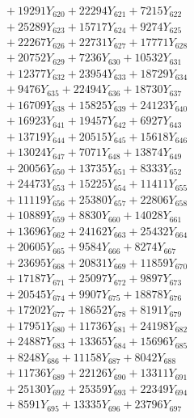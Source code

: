 \documentclass[a4paper,10pt]{article}
\begin{document}
{\begin{align}
&\;  + 19291 Y_{620} + 22294 Y_{621} + 7215 Y_{622} \\[0.3ex]
&\;  + 25289 Y_{623} + 15717 Y_{624} + 9274 Y_{625} \\[0.3ex]
&\;  + 22267 Y_{626} + 22731 Y_{627} + 17771 Y_{628} \\[0.5ex]\allowbreak
&\;  + 20752 Y_{629} + 7236 Y_{630} + 10532 Y_{631} \\[0.3ex]
&\;  + 12377 Y_{632} + 23954 Y_{633} + 18729 Y_{634} \\[0.3ex]
&\;  + 9476 Y_{635} + 22494 Y_{636} + 18730 Y_{637} \\[0.3ex]
&\;  + 16709 Y_{638} + 15825 Y_{639} + 24123 Y_{640} \\[0.3ex]
&\;  + 16923 Y_{641} + 19457 Y_{642} + 6927 Y_{643} \\[0.3ex]
&\;  + 13719 Y_{644} + 20515 Y_{645} + 15618 Y_{646} \\[0.3ex]
&\;  + 13024 Y_{647} + 7071 Y_{648} + 13874 Y_{649} \\[0.3ex]
&\;  + 20056 Y_{650} + 13735 Y_{651} + 8333 Y_{652} \\[0.3ex]
&\;  + 24473 Y_{653} + 15225 Y_{654} + 11411 Y_{655} \\[0.3ex]
&\;  + 11119 Y_{656} + 25380 Y_{657} + 22806 Y_{658} \\[0.5ex]\allowbreak
&\;  + 10889 Y_{659} + 8830 Y_{660} + 14028 Y_{661} \\[0.3ex]
&\;  + 13696 Y_{662} + 24162 Y_{663} + 25432 Y_{664} \\[0.3ex]
&\;  + 20605 Y_{665} + 9584 Y_{666} + 8274 Y_{667} \\[0.3ex]
&\;  + 23695 Y_{668} + 20831 Y_{669} + 11859 Y_{670} \\[0.3ex]
&\;  + 17187 Y_{671} + 25097 Y_{672} + 9897 Y_{673} \\[0.3ex]
&\;  + 20545 Y_{674} + 9907 Y_{675} + 18878 Y_{676} \\[0.3ex]
&\;  + 17202 Y_{677} + 18652 Y_{678} + 8191 Y_{679} \\[0.3ex]
&\;  + 17951 Y_{680} + 11736 Y_{681} + 24198 Y_{682} \\[0.3ex]
&\;  + 24887 Y_{683} + 13365 Y_{684} + 15696 Y_{685} \\[0.3ex]
&\;  + 8248 Y_{686} + 11158 Y_{687} + 8042 Y_{688} \\[0.5ex]\allowbreak
&\;  + 11736 Y_{689} + 22126 Y_{690} + 13311 Y_{691} \\[0.3ex]
&\;  + 25130 Y_{692} + 25359 Y_{693} + 22349 Y_{694} \\[0.3ex]
&\;  + 8591 Y_{695} + 13335 Y_{696} + 23796 Y_{697} \\[0.3ex]

\end{align}}
\end{document}
